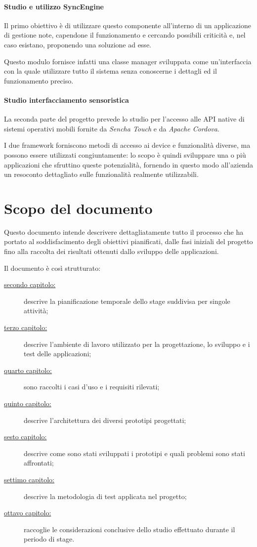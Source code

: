 \paragraph*{Studio e utilizzo SyncEngine}
Il primo obiettivo è di utilizzare questo componente all'interno di un applicazione di gestione note, capendone il funzionamento e cercando possibili criticità e, nel caso esistano, proponendo una soluzione ad esse.

Questo modulo fornisce infatti una classe manager sviluppata come un'interfaccia con la quale utilizzare tutto il sistema senza conoscerne i dettagli ed il funzionamento preciso.

\paragraph*{Studio interfacciamento sensoristica}
La seconda parte del progetto prevede lo studio per l'accesso alle \ac{API} native di sistemi operativi mobili fornite da \emph{Sencha Touch} e da \emph{Apache Cordova}.

I due framework forniscono metodi di accesso ai device e funzionalità diverse, ma possono essere utilizzati congiuntamente: lo scopo è quindi sviluppare una o più applicazioni che sfruttino queste potenzialità, fornendo in questo modo all'azienda un resoconto dettagliato sulle funzionalità realmente utilizzabili.

\section{Scopo del documento}
Questo documento intende descrivere dettagliatamente tutto il processo che ha portato al soddisfacimento degli obiettivi pianificati, dalle fasi iniziali del progetto fino alla raccolta dei risultati ottenuti dallo sviluppo delle applicazioni.

Il documento è così strutturato:
\begin{description}
\item[{\hyperref[ch:pianificazione]{secondo capitolo:}}] descrive la pianificazione temporale dello stage suddivisa per singole attività; 
\item[{\hyperref[ch:ambiente]{terzo capitolo:}}] descrive l'ambiente di lavoro utilizzato per la progettazione, lo sviluppo e i test delle applicazioni;
\item[{\hyperref[ch:requisiti]{quarto capitolo:}}] sono raccolti i casi d'uso e i requisiti rilevati;
\item[{\hyperref[ch:progettazione]{quinto capitolo:}}] descrive l'architettura dei diversi prototipi progettati;
\item[{\hyperref[ch:sviluppo]{sesto capitolo:}}] descrive come sono stati sviluppati i prototipi e quali problemi sono stati affrontati;
\item[{\hyperref[ch:test]{settimo capitolo:}}] descrive la metodologia di test applicata nel progetto;
\item[{\hyperref[ch:conclusioni]{ottavo capitolo:}}] raccoglie le considerazioni conclusive dello studio effettuato durante il periodo di stage.
\end{description}

